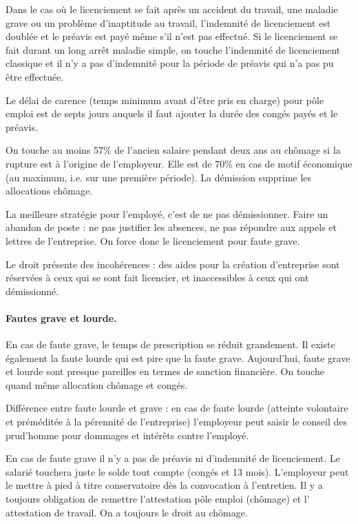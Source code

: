 Dans le cas où le licenciement se fait après un accident du travail, une maladie grave ou un problème d'inaptitude au travail, l'indemnité de licenciement est doublée et le préavis est payé même s'il n'est pas effectué.
Si le licenciement se fait durant un long arrêt maladie simple, on touche l'indemnité de licenciement classique et il n'y a pas d'indemnité pour la période de préavis qui n'a pas pu être effectuée.

Le délai de carence (temps minimum avant d'être pris en charge) pour pôle emploi est de septs jours auquels il faut ajouter la durée des congés payés et le préavis.

On touche au moins 57\% de l'ancien salaire pendant deux ans au chômage si la rupture est à l’origine de l’employeur.
Elle est de 70\% en cas de motif économique (au maximum, i.e. sur une première période).
La démission supprime les allocations chômage.

La meilleure stratégie pour l’employé, c’est de ne pas démissionner.
Faire un abandon de poste : ne pas justifier les absences, ne pas répondre aux appels et lettres de l’entreprise.
On force donc le licenciement pour faute grave.

Le droit présente des incohérences : des aides pour la création d'entreprise sont réservées à ceux qui se sont fait licencier, et inaccessibles à ceux qui ont démissionné.


\paragraph{Fautes grave et lourde.}
En cas de faute grave, le temps de prescription se réduit grandement.
Il existe également la faute lourde qui est pire que la faute grave.
Aujourd’hui, faute grave et lourde sont presque pareilles en termes de sanction financière.
On touche quand même allocation chômage et congés.

Différence entre faute lourde et grave : en cas de faute lourde (atteinte volontaire et préméditée à la pérennité de l'entreprise) l’employeur peut saisir le conseil des prud’homme pour dommages et intérêts contre l’employé.

En cas de faute grave il n'y a pas de préavis ni d’indemnité de licenciement. Le salarié touchera juste le solde tout compte (congés et 13 mois).
L’employeur peut le mettre à pied à titre conservatoire dès la convocation à l’entretien.
Il y a toujours obligation de remettre l'attestation pôle emploi (chômage) et l' attestation de travail.
On a toujours le droit au chômage.


